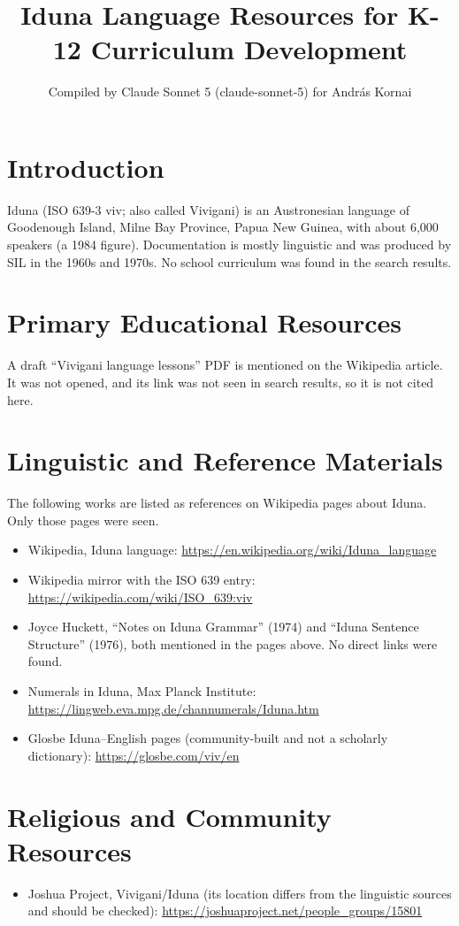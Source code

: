 \documentclass[12pt]{article}
\title{Iduna Language Resources for K-12 Curriculum Development}
\author{Compiled by Claude Sonnet 5 (claude-sonnet-5) for Andr\'as Kornai}
\date{}
\begin{document}
\maketitle

\section{Introduction}
Iduna (ISO 639-3 viv; also called Vivigani) is an Austronesian language of Goodenough Island, Milne Bay Province, Papua New Guinea, with about 6,000 speakers (a 1984 figure). Documentation is mostly linguistic and was produced by SIL in the 1960s and 1970s. No school curriculum was found in the search results.

\section{Primary Educational Resources}
A draft ``Vivigani language lessons'' PDF is mentioned on the Wikipedia article. It was not opened, and its link was not seen in search results, so it is not cited here.

\section{Linguistic and Reference Materials}
The following works are listed as references on Wikipedia pages about Iduna. Only those pages were seen.
\begin{itemize}
\item Wikipedia, Iduna language: \url{https://en.wikipedia.org/wiki/Iduna_language}
\item Wikipedia mirror with the ISO 639 entry: \url{https://wikipedia.com/wiki/ISO_639:viv}
\item Joyce Huckett, ``Notes on Iduna Grammar'' (1974) and ``Iduna Sentence Structure'' (1976), both mentioned in the pages above. No direct links were found.
\item Numerals in Iduna, Max Planck Institute: \url{https://lingweb.eva.mpg.de/channumerals/Iduna.htm}
\item Glosbe Iduna--English pages (community-built and not a scholarly dictionary): \url{https://glosbe.com/viv/en}
\end{itemize}

\section{Religious and Community Resources}
\begin{itemize}
\item Joshua Project, Vivigani/Iduna (its location differs from the linguistic sources and should be checked): \url{https://joshuaproject.net/people_groups/15801}
\end{itemize}
\end{document}
